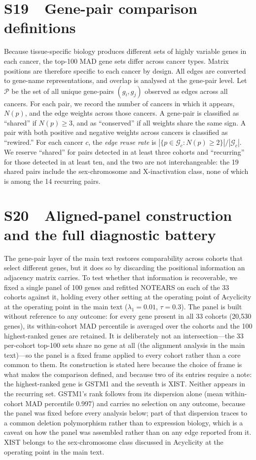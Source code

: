 \documentclass[11pt]{article}
\begin{document}
\section*{S19\ \ Gene-pair comparison definitions}

Because tissue-specific biology produces different sets of highly variable genes in each cancer, the top-100 MAD gene sets differ across cancer types. Matrix positions are therefore specific to each cancer by design. All edges are converted to gene-name representations, and overlap is analysed at the gene-pair level. Let $\mathcal{P}$ be the set of all unique gene-pairs $(g_i, g_j)$ observed as edges across all cancers. For each pair, we record the number of cancers in which it appears, $N(p)$, and the edge weights across those cancers. A gene-pair is classified as ``shared'' if $N(p) \ge 3$, and as ``conserved'' if all weights share the same sign. A pair with both positive and negative weights across cancers is classified as ``rewired.'' For each cancer $c$, the \emph{edge reuse rate} is $|\{p \in \mathcal{G}_c : N(p) \ge 2\}| / |\mathcal{G}_c|$. We reserve ``shared'' for pairs detected in at least three cohorts and ``recurring'' for those detected in at least ten, and the two are not interchangeable: the 19 shared pairs include the sex-chromosome and X-inactivation class, none of which is among the 14 recurring pairs.

\section*{S20\ \ Aligned-panel construction and the full diagnostic battery}

The gene-pair layer of the main text restores comparability across cohorts that select different genes, but it does so by discarding the positional information an adjacency matrix carries. To test whether that information is recoverable, we fixed a single panel of 100 genes and refitted NOTEARS on each of the 33 cohorts
against it, holding every other setting at the operating point of
Acyclicity at the operating point in the main text ($\lambda_1 = 0.01$, $\tau = 0.3$). The panel is built without
reference to any outcome: for every gene present in all 33 cohorts (20{,}530 genes), its
within-cohort MAD percentile is averaged over the cohorts and the 100 highest-ranked genes
are retained. It is deliberately not an intersection---the 33 per-cohort top-100 sets share
no gene at all (the alignment analysis in the main text)---so the panel is a fixed frame applied to every
cohort rather than a core common to them. Its construction is stated here because the choice
of frame is what makes the comparison defined, and because two of its entries require a
note: the highest-ranked gene is GSTM1 and the seventh is XIST. Neither appears in the
recurring set. GSTM1's rank follows from its dispersion alone (mean within-cohort MAD
percentile 0.997) and carries no selection on any outcome, because the panel was fixed before
every analysis below; part of that dispersion traces to a common deletion polymorphism rather
than to expression biology, which is a caveat on how the panel was assembled rather than on any
edge reported from it. XIST belongs to the sex-chromosome class discussed in
Acyclicity at the operating point in the main text.
\end{document}
